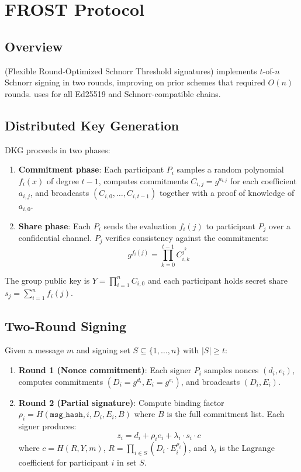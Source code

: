\section{FROST Protocol}

\label{sec:frost}

\subsection{Overview}

\FROST{} (Flexible Round-Optimized Schnorr Threshold signatures) \cite{komlo2020frost} implements $t$-of-$n$ Schnorr signing in two rounds, improving on prior schemes that required $O(n)$ rounds. \TChain{} uses \FROST{} for all Ed25519 and Schnorr-compatible chains.

\subsection{Distributed Key Generation}

\FROST{} DKG proceeds in two phases:

\begin{enumerate}
\item \textbf{Commitment phase}: Each participant $P_i$ samples a random polynomial $f_i(x)$ of degree $t-1$, computes commitments $C_{i,j} = g^{a_{i,j}}$ for each coefficient $a_{i,j}$, and broadcasts $(C_{i,0}, \ldots, C_{i,t-1})$ together with a proof of knowledge of $a_{i,0}$.
\item \textbf{Share phase}: Each $P_i$ sends the evaluation $f_i(j)$ to participant $P_j$ over a confidential channel. $P_j$ verifies consistency against the commitments:
\[
g^{f_i(j)} = \prod_{k=0}^{t-1} C_{i,k}^{j^k}
\]
\end{enumerate}

The group public key is $Y = \prod_{i=1}^{n} C_{i,0}$ and each participant holds secret share $s_j = \sum_{i=1}^{n} f_i(j)$.

\subsection{Two-Round Signing}

Given a message $m$ and signing set $S \subseteq \{1,\ldots,n\}$ with $|S| \geq t$:

\begin{enumerate}
\item \textbf{Round 1 (Nonce commitment)}: Each signer $P_i$ samples nonces $(d_i, e_i)$, computes commitments $(D_i = g^{d_i}, E_i = g^{e_i})$, and broadcasts $(D_i, E_i)$.
\item \textbf{Round 2 (Partial signature)}: Compute binding factor $\rho_i = H(\texttt{msg\_hash}, i, D_i, E_i, B)$ where $B$ is the full commitment list. Each signer produces:
\[
z_i = d_i + \rho_i e_i + \lambda_i \cdot s_i \cdot c
\]
where $c = H(R, Y, m)$, $R = \prod_{i \in S}(D_i \cdot E_i^{\rho_i})$, and $\lambda_i$ is the Lagrange coefficient for participant $i$ in set $S$.
\end{enumerate}

